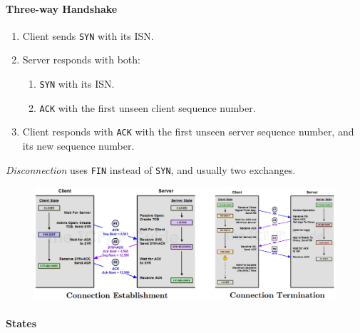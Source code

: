 \documentclass[twocolumn,english]{article}
\begin{document}
\paragraph{Three-way Handshake}
\begin{enumerate}
\item Client sends \texttt{SYN} with its ISN.
\item Server responds with both:
\begin{enumerate}
\item \texttt{SYN} with its ISN.
\item \texttt{ACK} with the first unseen client sequence number.
\end{enumerate}
\item Client responds with \texttt{ACK} with the first unseen server sequence
number, and its new sequence number.
\end{enumerate}
\emph{Disconnection} uses \texttt{FIN} instead of \texttt{SYN}, and
usually two exchanges.
\begin{figure}[H]
\centering{}\includegraphics[width=1\linewidth]{img/handshake}
\end{figure}

\paragraph{States}
\end{document}
